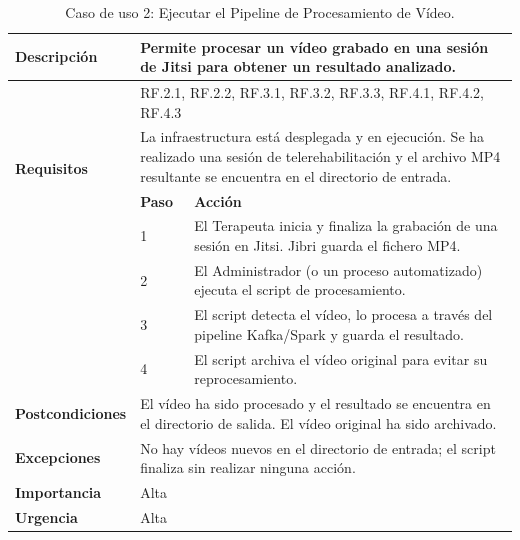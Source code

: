 \begin{table}[H]
    \centering
    \caption{Caso de uso 2: Ejecutar el Pipeline de Procesamiento de Vídeo.}
    \label{tab:uc2}
    \begin{tabular}{|p{3cm}|p{0.75cm}|p{8.5cm}|}
        \hline
        \textbf{Descripción} & \multicolumn{2}{p{9.25cm}|}{Permite procesar un vídeo grabado en una sesión de Jitsi para obtener un resultado analizado.} \\
        \hline
        \multirow{4}{3cm}{\textbf{Requisitos}} & \multicolumn{2}{p{9.25cm}|}{RF.2.1, RF.2.2, RF.3.1, RF.3.2, RF.3.3, RF.4.1, RF.4.2, RF.4.3} \\
        \hline
        \textbf{Precondiciones} & \multicolumn{2}{p{9.25cm}|}{La infraestructura está desplegada y en ejecución. Se ha realizado una sesión de telerehabilitación y el archivo MP4 resultante se encuentra en el directorio de entrada.} \\
        \hline
        \multirow{4}{3cm}{\textbf{Secuencia Normal}} & \textbf{Paso} & \textbf{Acción} \\ \cline{2-3}
         & 1 & El Terapeuta inicia y finaliza la grabación de una sesión en Jitsi. Jibri guarda el fichero MP4. \\ \cline{2-3}
         & 2 & El Administrador (o un proceso automatizado) ejecuta el script de procesamiento. \\ \cline{2-3}
         & 3 & El script detecta el vídeo, lo procesa a través del pipeline Kafka/Spark y guarda el resultado. \\ \cline{2-3}
         & 4 & El script archiva el vídeo original para evitar su reprocesamiento. \\
        \hline
        \textbf{Postcondiciones} & \multicolumn{2}{p{9.25cm}|}{El vídeo ha sido procesado y el resultado se encuentra en el directorio de salida. El vídeo original ha sido archivado.} \\
        \hline
        \textbf{Excepciones} & \multicolumn{2}{p{9.25cm}|}{No hay vídeos nuevos en el directorio de entrada; el script finaliza sin realizar ninguna acción.} \\
        \hline
        \textbf{Importancia} & \multicolumn{2}{p{9.25cm}|}{Alta} \\
        \hline
        \textbf{Urgencia} & \multicolumn{2}{p{9.25cm}|}{Alta} \\
        \hline
    \end{tabular}
\end{table}